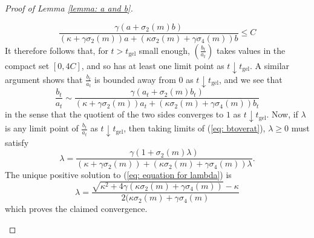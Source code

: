 \begin{proof}[Proof of Lemma \ref{lemma: a and b}]
\begin{enumerate}[label=\roman{*}).]
\begin{equation}
       \frac{\gamma( a+\sigma_2(m)b)}{(\kappa+\gamma \sigma_2(m))a+(\kappa \sigma_2(m)+\gamma\sigma_4(m))b}\le C
   \end{equation} It therefore follows that, for $t> t_\mathrm{gel}$ small enough, $(\frac{b_t}{a_t})$ takes values in the compact set $[0,4C]$, and so has at least one limit point as $t\downarrow t_\mathrm{gel}$. A similar argument shows that $\frac{b_t}{a_t}$ is bounded away from $0$ as $t\downarrow t_\mathrm{gel}$, and we see that \begin{equation}\label{eq: btoverat}
        \frac{b_t}{a_t}\sim \frac{\gamma (a_t+\sigma_2(m)b_t)}{(\kappa+\gamma \sigma_2(m))a_t+(\kappa \sigma_2(m)+\gamma\sigma_4(m))b_t}
    \end{equation} in the sense that the quotient of the two sides converges to $1$ as $t\downarrow t_\mathrm{gel}$. Now, if $\lambda$ is any limit point of $\frac{b_t}{a_t}$ as $t\downarrow t_\mathrm{gel}$, then taking limits of (\ref{eq: btoverat}), $\lambda \ge 0$ must satisfy \begin{equation}\label{eq: equation for lambda}
        \lambda=\frac{\gamma(1 +\sigma_2(m)\lambda)}{(\kappa+\gamma \sigma_2(m))+(\kappa \sigma_2(m)+\gamma\sigma_4(m))\lambda}.
    \end{equation}The unique positive solution to (\ref{eq: equation for lambda}) is \begin{equation}
       \lambda=\frac{\sqrt{\kappa^2+4\gamma(\kappa\sigma_2(m)+\gamma \sigma_4(m))}-\kappa}{2(\kappa\sigma_2(m)+\gamma\sigma_4(m)}
    \end{equation} which proves the claimed convergence.
\end{enumerate}\end{proof}